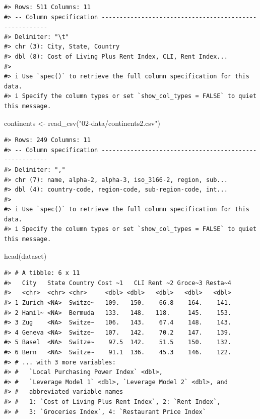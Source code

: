 \documentclass[
  11pt,
  a4paper,
  twoside]{scrbook}
\newenvironment{Shaded}{\begin{snugshade}}{\end{snugshade}}
\newcommand{\FunctionTok}[1]{\textcolor[rgb]{0.00,0.00,0.00}{#1}}
\newcommand{\NormalTok}[1]{#1}
\newcommand{\OtherTok}[1]{\textcolor[rgb]{0.56,0.35,0.01}{#1}}
\newcommand{\StringTok}[1]{\textcolor[rgb]{0.31,0.60,0.02}{#1}}
\begin{document}
\linespread{1}

\begin{verbatim}
#> Rows: 511 Columns: 11
#> -- Column specification -------------------------------------------------------
#> Delimiter: "\t"
#> chr (3): City, State, Country
#> dbl (8): Cost of Living Plus Rent Index, CLI, Rent Index...
#> 
#> i Use `spec()` to retrieve the full column specification for this data.
#> i Specify the column types or set `show_col_types = FALSE` to quiet this message.
\end{verbatim}

\linespread{1}

\begin{Shaded}
\begin{Highlighting}[]
\NormalTok{continents }\OtherTok{\textless{}{-}} \FunctionTok{read\_csv}\NormalTok{(}\StringTok{"02{-}data/continents2.csv"}\NormalTok{)}
\end{Highlighting}
\end{Shaded}

\linespread{1}

\begin{verbatim}
#> Rows: 249 Columns: 11
#> -- Column specification -------------------------------------------------------
#> Delimiter: ","
#> chr (7): name, alpha-2, alpha-3, iso_3166-2, region, sub...
#> dbl (4): country-code, region-code, sub-region-code, int...
#> 
#> i Use `spec()` to retrieve the full column specification for this data.
#> i Specify the column types or set `show_col_types = FALSE` to quiet this message.
\end{verbatim}

\linespread{1}

\begin{Shaded}
\begin{Highlighting}[]

\FunctionTok{head}\NormalTok{(dataset)}
\end{Highlighting}
\end{Shaded}

\linespread{1}

\begin{verbatim}
#> # A tibble: 6 x 11
#>   City   State Country Cost ~1   CLI Rent ~2 Groce~3 Resta~4
#>   <chr>  <chr> <chr>     <dbl> <dbl>   <dbl>   <dbl>   <dbl>
#> 1 Zurich <NA>  Switze~   109.   150.    66.8    164.    141.
#> 2 Hamil~ <NA>  Bermuda   133.   148.   118.     145.    153.
#> 3 Zug    <NA>  Switze~   106.   143.    67.4    148.    143.
#> 4 Geneva <NA>  Switze~   107.   142.    70.2    147.    139.
#> 5 Basel  <NA>  Switze~    97.5  142.    51.5    150.    132.
#> 6 Bern   <NA>  Switze~    91.1  136.    45.3    146.    122.
#> # ... with 3 more variables:
#> #   `Local Purchasing Power Index` <dbl>,
#> #   `Leverage Model 1` <dbl>, `Leverage Model 2` <dbl>, and
#> #   abbreviated variable names
#> #   1: `Cost of Living Plus Rent Index`, 2: `Rent Index`,
#> #   3: `Groceries Index`, 4: `Restaurant Price Index`
\end{verbatim}
\end{document}
